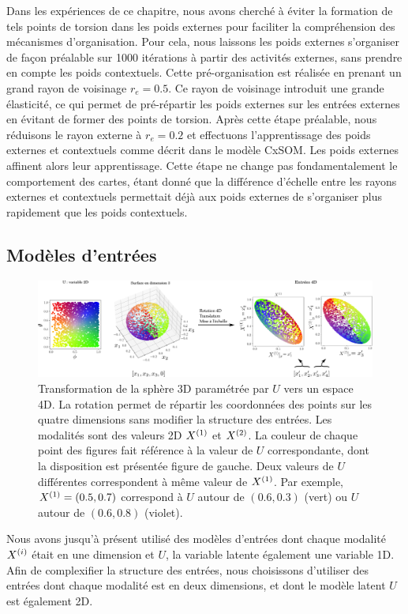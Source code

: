 \documentclass[../main]{subfiles}
\begin{document}
Dans les expériences de ce chapitre, nous avons cherché à éviter la formation de tels points de torsion dans les poids externes pour faciliter la compréhension des mécanismes d'organisation.
Pour cela, nous laissons les poids externes s'organiser de façon préalable sur 1000 itérations à partir des activités externes, sans prendre en compte les poids contextuels. Cette pré-organisation est réalisée en prenant un grand rayon de voisinage $r_e = 0.5$.
Ce rayon de voisinage introduit une grande élasticité, ce qui permet de pré-répartir les poids externes sur les entrées externes en évitant de former des points de torsion. 
Après cette étape préalable, nous réduisons le rayon externe à $r_e = 0.2$ et effectuons l'apprentissage des poids externes et contextuels comme décrit dans le modèle CxSOM. Les poids externes affinent alors leur apprentissage. Cette étape ne change pas fondamentalement le comportement des cartes, étant donné que la différence d'échelle entre les rayons externes et contextuels permettait déjà aux poids externes de s'organiser plus rapidement que les poids contextuels.

\subsection{Modèles d'entrées}
\begin{figure}
	\includegraphics[width=\textwidth]{sphere_inputs_colormap.png}
	\caption{Transformation de la sphère 3D paramétrée par $U$ vers un espace 4D. La rotation permet de répartir les coordonnées des points sur les quatre dimensions sans modifier la structure des entrées. Les modalités sont des valeurs 2D $X^{({1})}$ et $X^{({2})}$.
	La couleur de chaque point des figures fait référence à la valeur de $U$ correspondante, dont la disposition est présentée figure de gauche. Deux valeurs de $U$ différentes correspondent à même valeur de $X^{({1})}$. Par exemple, $X^{({1})} = (0.5, 0.7)$ correspond à $U$ autour de $(0.6,0.3)$ (vert) ou $U$ autour de $ (0.6,0.8)$ (violet).
	\label{fig:sphere_inputs}}
\end{figure}

Nous avons jusqu'à présent utilisé des modèles d'entrées dont chaque modalité $X^{({i})}$ était en une dimension et $U$, la variable latente également une variable 1D. 
Afin de complexifier la structure des entrées, nous choisissons d'utiliser des entrées dont chaque modalité est en deux dimensions, et dont le modèle latent $U$ est également 2D.
\end{document}
